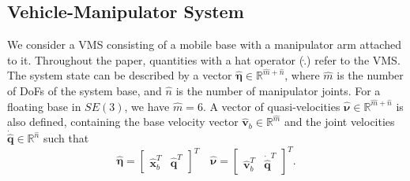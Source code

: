 \documentclass[../main.tex]{subfiles}
\begin{document}
\subsection{Vehicle-Manipulator System}
We consider a VMS consisting of a mobile base with a  manipulator arm attached to it. Throughout the paper, quantities with a hat operator ($\hat{.}$) refer to the VMS. The system state can be described by a vector $\hat{\bm{\eta}} \in \mathbb{R}^{\hat{m} + \hat{n}}$, where $\hat{m}$ is the number of DoFs of the system base, and $\hat{n}$ is the number of manipulator joints. For a floating base in $SE(3)$, we have $\hat{m}=6$. A vector of quasi-velocities $\hat{\bm{\nu}} \in \mathbb{R}^{\hat{m}+\hat{n}}$ is also defined, containing the base velocity vector $\hat{\bm{v}}_b \in \mathbb{R}^{\hat{m}}$ and the joint velocities $\dot{\hat{\bm{q}}} \in \mathbb{R}^{\hat{n}}$ such that
\begin{equation}
    \hat{\bm{\eta}} =
    \begin{bmatrix}
        \hat{\bm{x}}_b^T & \hat{\bm{q}}^T
    \end{bmatrix}^T
    \quad
    \hat{\bm{\nu}} =
    \begin{bmatrix}
       \hat{\bm{v}}_b^T & \dot{\hat{\bm{q}}}^T
    \end{bmatrix}^T.
\end{equation} \par
\end{document}
